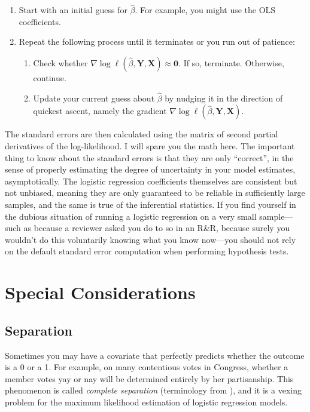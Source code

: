 \documentclass[
  12pt,
  oneside,openany]{book}
\begin{document}
\begin{enumerate}
\def\labelenumi{\arabic{enumi}.}
\item
  Start with an initial guess for \(\hat{\beta}\).
  For example, you might use the OLS coefficients.
\item
  Repeat the following process until it terminates or you run out of patience:

  \begin{enumerate}
  \def\labelenumii{\alph{enumii}.}
  \item
    Check whether \(\nabla \log \ell(\hat{\beta}, \mathbf{Y}, \mathbf{X}) \approx \mathbf{0}\). If so, terminate. Otherwise, continue.
  \item
    Update your current guess about \(\hat{\beta}\) by nudging it in the direction of quickest ascent, namely the gradient \(\nabla \log \ell(\hat{\beta}, \mathbf{Y}, \mathbf{X})\).
  \end{enumerate}
\end{enumerate}

The standard errors are then calculated using the matrix of second partial derivatives of the log-likelihood.
I will spare you the math here.
The important thing to know about the standard errors is that they are only ``correct'', in the sense of properly estimating the degree of uncertainty in your model estimates, asymptotically.
The logistic regression coefficients themselves are consistent but not unbiased, meaning they are only guaranteed to be reliable in sufficiently large samples, and the same is true of the inferential statistics.
If you find yourself in the dubious situation of running a logistic regression on a very small sample---such as because a reviewer asked you do to so in an R\&R, because surely you wouldn't do this voluntarily knowing what you know now---you should not rely on the default standard error computation when performing hypothesis tests.

\hypertarget{special-considerations}{%
\section{Special Considerations}\label{special-considerations}}

\hypertarget{separation}{%
\subsection{Separation}\label{separation}}

Sometimes you may have a covariate that perfectly predicts whether the outcome is a 0 or a 1.
For example, on many contentious votes in Congress, whether a member votes yay or nay will be determined entirely by her partisanship.
This phenomenon is called \emph{complete separation} (terminology from \citet{albert1984existence}), and it is a vexing problem for the maximum likelihood estimation of logistic regression models.
\end{document}
